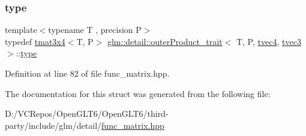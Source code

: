 \subsubsection{\texorpdfstring{type}{type}}
{\footnotesize\ttfamily template$<$typename T , precision P$>$ \\
typedef \mbox{\hyperlink{structglm_1_1tmat3x4}{tmat3x4}}$<$T, P$>$ \mbox{\hyperlink{structglm_1_1detail_1_1outer_product__trait}{glm\+::detail\+::outer\+Product\+\_\+trait}}$<$ T, P, \mbox{\hyperlink{structglm_1_1tvec4}{tvec4}}, \mbox{\hyperlink{structglm_1_1tvec3}{tvec3}} $>$\+::\mbox{\hyperlink{structglm_1_1detail_1_1outer_product__trait_3_01_t_00_01_p_00_01tvec4_00_01tvec3_01_4_a1e1df085b79e67665ed53cb59d80af07}{type}}}



Definition at line 82 of file func\+\_\+matrix.\+hpp.



The documentation for this struct was generated from the following file\+:\begin{DoxyCompactItemize}
\item 
D\+:/\+V\+C\+Repos/\+Open\+G\+L\+T6/\+Open\+G\+L\+T6/third-\/party/include/glm/detail/\mbox{\hyperlink{func__matrix_8hpp}{func\+\_\+matrix.\+hpp}}\end{DoxyCompactItemize}

